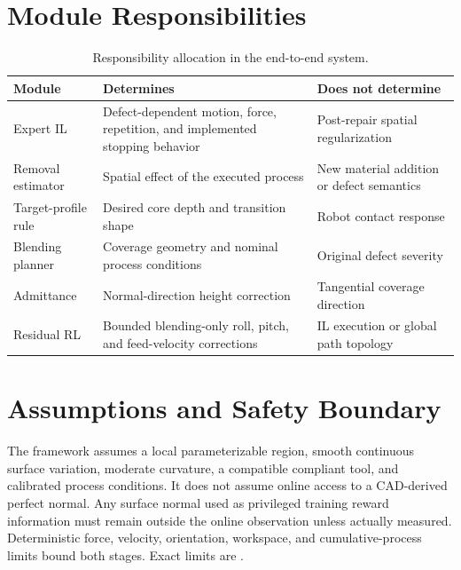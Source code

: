 \section{Module Responsibilities}
\begin{table}[t]
\centering
\caption{Responsibility allocation in the end-to-end system.}
\label{tab:module_responsibilities}
\small
\begin{tabularx}{\textwidth}{p{}XX}
\toprule
Module & Determines & Does not determine \\
\midrule
Expert IL & Defect-dependent motion, force, repetition, and implemented stopping behavior & Post-repair spatial regularization \\
Removal estimator & Spatial effect of the executed process & New material addition or defect semantics \\
Target-profile rule & Desired core depth and transition shape & Robot contact response \\
Blending planner & Coverage geometry and nominal process conditions & Original defect severity \\
Admittance & Normal-direction height correction & Tangential coverage direction \\
Residual RL & Bounded blending-only roll, pitch, and feed-velocity corrections & IL execution or global path topology \\
\bottomrule
\end{tabularx}
\end{table}

\section{Assumptions and Safety Boundary}
The framework assumes a local parameterizable region, smooth continuous surface variation, moderate curvature, a compatible compliant tool, and calibrated process conditions. It does not assume online access to a CAD-derived perfect normal. Any surface normal used as privileged training reward information must remain outside the online observation unless actually measured. Deterministic force, velocity, orientation, workspace, and cumulative-process limits bound both stages. Exact limits are .
